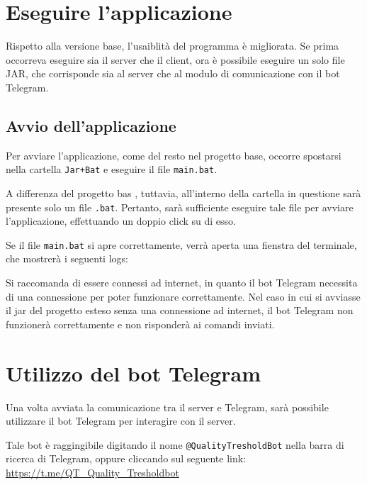 \section{Eseguire l'applicazione}

Rispetto alla versione base, l'usaiblità del programma è migliorata. Se prima occorreva eseguire sia il server che il client, ora è possibile eseguire un solo file JAR, che corrisponde sia al server che al modulo di comunicazione con il bot Telegram. 

\subsection{Avvio dell'applicazione}

Per avviare l'applicazione, come del resto nel progetto base, occorre spostarsi nella cartella \texttt{Jar+Bat} e eseguire il file \texttt{main.bat}. 

A differenza del progetto bas , tuttavia, all'interno della cartella in questione sarà presente solo un file \texttt{.bat}. Pertanto, sarà sufficiente eseguire tale file per avviare l'applicazione, effettuando un doppio click su di esso.

Se il file \texttt{main.bat} si apre correttamente, verrà aperta una fienstra del terminale, che mostrerà i seguenti logs: 


\begin{tcolorbox}[ colback=white!5!white, colframe=gray, title={Avvertenza} ]
    Si raccomanda di essere connessi ad internet, in quanto il bot Telegram necessita di una connessione per poter funzionare correttamente. Nel caso in cui si avviasse il jar del progetto esteso senza una connessione ad internet, il bot Telegram non funzionerà correttamente e non risponderà ai comandi inviati.
\end{tcolorbox}

\section{Utilizzo del bot Telegram}

Una volta avviata la comunicazione tra il server e Telegram, sarà possibile utilizzare il bot Telegram per interagire con il server.

Tale bot è raggingibile digitando il nome \texttt{@QualityTresholdBot} nella barra di ricerca di Telegram, oppure cliccando sul seguente link: \url{https://t.me/QT_Quality_Tresholdbot}


